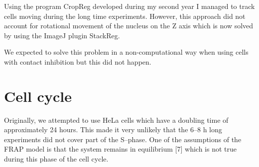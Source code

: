  Using the program CropReg developed during my second year I managed to
  track cells moving during the long time experiments. However, this approach
  did not account for rotational movement of the nucleus on the Z axis which
  is now solved by using the ImageJ plugin StackReg.

  We expected to solve this problem in a non-computational way when using
  cells with contact inhibition but this did not happen.




\section{Cell cycle}


  


Originally, we attempted to use HeLa cells which have a doubling time of
approximately 24 hours. This made it very unlikely that the 6–8 h long
experiments did not cover part of the S–phase. One of the assumptions of
the FRAP model is that the system remains in equilibrium [7] which is not
true during this phase of the cell cycle.

